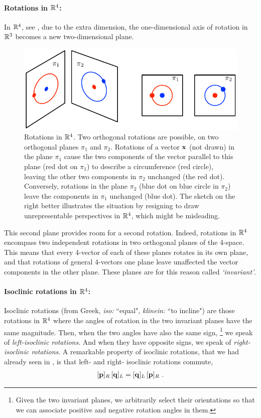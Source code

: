 \paragraph{Rotations in ${\mathbb R}^4$:} 
%
In ${\mathbb R}^4$, see , due to the extra dimension, the one-dimensional axis of rotation in ${\mathbb R}^3$ becomes a new two-dimensional plane.
%
\begin{figure}[tb]
\begin{center}
\includegraphics{figures/isoclinic4}
\caption{%
Rotations in ${\mathbb R}^4$. 
Two orthogonal rotations are possible, on two orthogonal planes $\pi_1$ and $\pi_2$. 
Rotations of a vector ${\bf x}$ (not drawn) in the plane $\pi_1$ cause the two components of the vector parallel to this plane (red dot on $\pi_1$) to describe a circumference (red circle), 
leaving the other two components in $\pi_2$ unchanged (the red dot). 
Conversely, rotations in the plane $\pi_2$ (blue dot on blue circle in $\pi_2$) leave the components in $\pi_1$ unchanged (blue dot).
The sketch on the right better illustrates the situation by resigning to draw unrepresentable perspectives in ${\mathbb R}^4$, which might be misleading.
}
\label{fig:isoclinic4}
\end{center}
\end{figure}
%
This second plane provides room for a second rotation.
Indeed, rotations in ${\mathbb R}^4$ encompass two independent rotations in two orthogonal planes of the 4-space. 
This means that every 4-vector of each of these planes rotates in its own plane, and that rotations of general 4-vectors \wrt one plane leave unaffected the vector components in the other plane. 
These planes are for this reason called \emph{`invariant'}.

\paragraph{Isoclinic rotations in ${\mathbb R}^4$:} 
%
Isoclinic rotations (from Greek, \emph{iso:} ``equal", \emph{klinein:} ``to incline") are those rotations in ${\mathbb R}^4$ where the angles of rotation in the two invariant planes have the same magnitude.
Then, when the two angles have also the same sign,%
\footnote{Given the two invariant planes, we arbitrarily select their orientations so that we can associate positive and negative rotation angles in them.}
we speak of \emph{left-isoclinic rotations}. 
And when they have opposite signs, we speak of \emph{right-isoclinic rotations}.
%
A remarkable property of isoclinic rotations, that we had already seen in  , is that left- and right- isoclinic rotations commute,
\begin{align}
 [{\bf p}]_R\,[{\bf q}]_L = [{\bf q}]_L\,[{\bf p}]_R~. \label{equ:isoclinic_commute}
\end{align}

